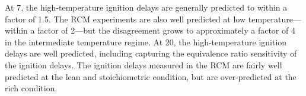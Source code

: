 \documentclass[../main.tex]{subfiles}
\begin{document}
At \SI{7}{\atmosphere}, the high-temperature ignition delays
are generally predicted to within a factor of 1.5. The RCM experiments
are also well predicted at low temperature---within a factor of 2---but
the disagreement grows to approximately a factor of 4 in the
intermediate temperature regime. At \SI{20}{\atmosphere}, the
high-temperature ignition delays are well predicted, including
capturing the equivalence ratio sensitivity of the ignition delays.
The ignition delays measured in the RCM are fairly well predicted
at the lean and stoichiometric condition, but are over-predicted
at the rich condition.
\end{document}
